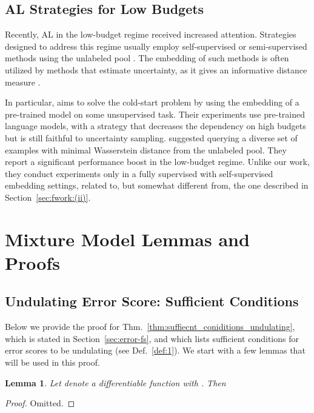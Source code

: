 \documentclass{article}
\newtheorem{lemma}{Lemma}
\begin{document}
\subsection{AL Strategies for Low Budgets}
Recently, AL in the low-budget regime received increased attention. Strategies designed to address this regime usually employ self-supervised or semi-supervised methods using the unlabeled pool \citep{gao2020consistency,hong2020deep,mahmood2021low,yehuda2022active}. The embedding of such methods is often utilized by methods that estimate uncertainty, as it gives an informative distance measure \citep{zhang2018unreasonable}.

In particular, \citet{DBLP:conf/emnlp/YuanLB20} aims to solve the cold-start problem by using the embedding of a pre-trained model on some unsupervised task. Their experiments use pre-trained language models, with a strategy that decreases the dependency on high budgets but is still faithful to uncertainty sampling. \citet{mahmood2021low} suggested querying a diverse set of examples with minimal Wasserstein distance from the unlabeled pool. They report a significant performance boost in the low-budget regime. Unlike our work, they conduct experiments only in a fully supervised with self-supervised embedding settings, related to, but somewhat different from, the one described in Section~\ref{sec:fwork:(ii)}.

\section{Mixture Model Lemmas and Proofs}




\subsection{Undulating Error Score: Sufficient Conditions}
\label{app:proof_for_thm_2}

Below we provide the proof for Thm.~\ref{thm:suffiecnt_coniditions_undulating}, which is stated in Section~\ref{sec:error-fs}, and which lists sufficient conditions for error scores to be undulating (see Def.~\ref{def:1}). We start with a few lemmas that will be used in this proof.

\begin{lemma}
\label{lemma:left_equal_1_new}
Let  denote a differentiable function with . Then 

\end{lemma}
\begin{proof}
Omitted.
\end{proof}
\end{document}

